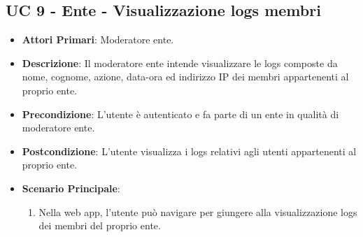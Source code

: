 		\subsection{UC 9 - Ente - Visualizzazione logs membri}
		\begin{itemize}
			\item \textbf{Attori Primari}: Moderatore ente.
			\item \textbf{Descrizione}: Il moderatore ente intende visualizzare le logs composte da nome, cognome, azione, data-ora ed indirizzo IP dei membri appartenenti al proprio ente.
			\item \textbf{Precondizione}: L'utente è autenticato e fa parte di un ente in qualità di moderatore ente.
			\item \textbf{Postcondizione}: L'utente visualizza i logs relativi agli utenti appartenenti al proprio ente.
			\item \textbf{Scenario Principale}:
			\begin{enumerate}
				\item Nella web app, l'utente può navigare per giungere alla visualizzazione logs dei membri del proprio ente.
			\end{enumerate}	
		\end{itemize}

